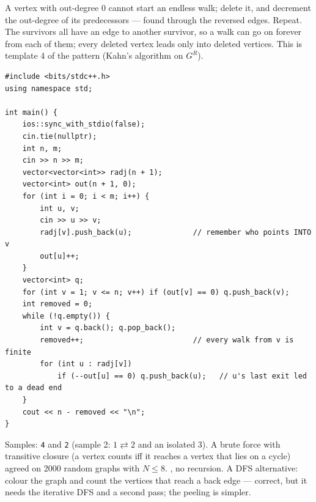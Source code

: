 \begin{solutionbox}
A vertex with out-degree 0 cannot start an endless walk; delete it, and decrement the out-degree of its predecessors --- found through the reversed edges. Repeat. The survivors all have an edge to another survivor, so a walk can go on forever from each of them; every deleted vertex leads only into deleted vertices. This is template 4 of the pattern (Kahn's algorithm on $G^R$).
\begin{center}
\end{center}
\begin{lstlisting}[style=cpp]
#include <bits/stdc++.h>
using namespace std;

int main() {
    ios::sync_with_stdio(false);
    cin.tie(nullptr);
    int n, m;
    cin >> n >> m;
    vector<vector<int>> radj(n + 1);
    vector<int> out(n + 1, 0);
    for (int i = 0; i < m; i++) {
        int u, v;
        cin >> u >> v;
        radj[v].push_back(u);              // remember who points INTO v
        out[u]++;
    }
    vector<int> q;
    for (int v = 1; v <= n; v++) if (out[v] == 0) q.push_back(v);
    int removed = 0;
    while (!q.empty()) {
        int v = q.back(); q.pop_back();
        removed++;                         // every walk from v is finite
        for (int u : radj[v])
            if (--out[u] == 0) q.push_back(u);   // u's last exit led to a dead end
    }
    cout << n - removed << "\n";
}
\end{lstlisting}
Samples: \texttt{4} and \texttt{2} (sample 2: $1 \rightleftarrows 2$ and an isolated 3). A brute force with transitive closure (a vertex counts iff it reaches a vertex that lies on a cycle) agreed on 2000 random graphs with $N \le 8$. , no recursion. A DFS alternative: colour the graph and count the vertices that reach a back edge --- correct, but it needs the iterative DFS and a second pass; the peeling is simpler.
\end{solutionbox}

